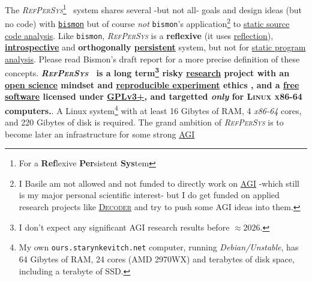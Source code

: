 \documentclass[11pt,a4paper,svgnames]{article}
\newcommand{\RefPerSys}{{\textit{\textsc{RefPerSys}}}}
\begin{document}
The \RefPerSys\footnote{For a \textbf{Ref}lexive \textbf{Per}sistent
  \textbf{Sys}tem}~ system shares several -but not all- goals and
design ideas (but no code) with
\href{http://github.com/bstarynk/bismon}{\texttt{bismon}}
\cite{Starynkevitch:2019:bismon-draft} but of course \emph{not}
\texttt{bismon}'s application\footnote{I Basile am not allowed and not
  funded to directly work on
  \href{https://en.wikipedia.org/wiki/Artificial_general_intelligence}{AGI}
  -which still is my major personal scientific interest- but I do get
  funded on applied research projects like
  \href{https://www.decoder-project.eu/}{\textsc{Decoder}} and try to
  push some AGI ideas into them.} to
\href{https://en.wikipedia.org/wiki/Static_program_analysis}{static
  source code analysis}. Like \texttt{bismon}, {\RefPerSys} is a
\textbf{reflexive} (it uses
\href{https://en.wikipedia.org/wiki/Reflection_(computer_programming)}{reflection}),
\textbf{\href{https://en.wikipedia.org/wiki/Virtual\_machine\_introspection}{introspective}}
and \textbf{orthogonally
  \href{https://en.wikipedia.org/wiki/Persistence_(computer_science)}{persistent}}
system, but not for
\href{https://en.wikipedia.org/wiki/Static_program_analysis}{static
  program analysis}. Please read Bismon's draft report
\cite{Starynkevitch:2019:bismon-draft} for a more precise definition
of these concepts. \textbf{\RefPerSys~ is a long term\footnote{I don't
    expect any significant AGI research results before $\approx
    2026$.}  risky
  \href{https://en.wikipedia.org/wiki/Research}{research} project with
  an \href{https://en.wikipedia.org/wiki/Open_science}{open science}
  mindset and
  \href{https://ropensci.github.io/reproducibility-guide/sections/introduction/}{reproducible
    experiment} ethics \cite{zuboff:2015:big-other,
    oneil:2016:weapons}, and a
  \href{https://www.gnu.org/philosophy/free-sw.en.html}{free software}
  licensed under
  \href{https://www.gnu.org/licenses/gpl-3.0.html}{GPLv3+}, and
  targetted \emph{only} for \textsc{Linux x86-64} computers.}. A Linux
system\footnote{My own \texttt{ours.starynkevitch.net} computer,
  running \textit{Debian/Unstable}, has 64 Gibytes of RAM, 24 cores
  (AMD 2970WX) and terabytes of disk space, including a terabyte of
  SSD.}  with at least 16 Gibytes of RAM, 4 \textit{x86-64} cores, and
220 Gibytes of disk is required. The grand ambition of {\RefPerSys} is
to become later an infrastructure for some strong
\href{https://en.wikipedia.org/wiki/Artificial_general_intelligence}{AGI}
\end{document}
